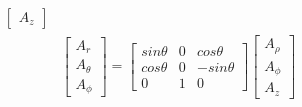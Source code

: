 \documentclass[10pt,letterpaper]{report}
\begin{document}
\begin{equation*}
\begin{split}
\begin{bmatrix}
           A_z
         \end{bmatrix} \\
        &\begin{bmatrix}
            A_r \\
            A_{\theta} \\
            A_{\phi}
          \end{bmatrix} 
          =
          \begin{bmatrix}
          sin \theta & 0 & cos \theta \\
          cos \theta & 0 & -sin \theta \\
          0          & 1 & 0
          \end{bmatrix} 
          \begin{bmatrix}
            A_{\rho} \\
            A_{\phi} \\
            A_z
          \end{bmatrix} 
      \end{split}
  \end{equation*}
\end{document}
